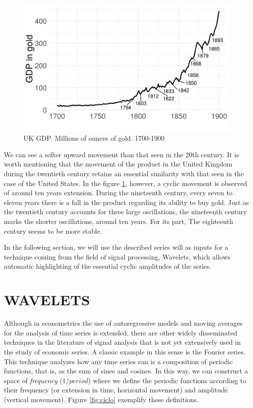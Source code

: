 \documentclass[a4paper,10cpi]{article}
\begin{document}
	\begin{figure}[H]
		\centering
		\includegraphics[width=0.75\linewidth]{uk_gdp_en.png}
		\caption{UK GDP. Millions of ounces of gold. 1700-1900} 
		\label{fig:uk_gdp}
	\end{figure}
	
	
	We can see a softer upward movement than that seen in the 20th century. It is worth mentioning that the movement of the product in the United Kingdom during the twentieth century retains an essential similarity with that seen in the case of the United States. In the figure \ref{fig:uk_gdp}, however, a cyclic movement is observed of around ten years extension. During the nineteenth century, every seven to eleven years there is a fall in the product regarding its ability to buy gold. Just as the twentieth century accounts for three large oscillations, the nineteenth century marks the shorter oscillations, around ten years. For its part, The eighteenth century seems to be more stable.
	
	In the following section, we will use the described series will as inputs for a technique coming from the field of signal processing, Wavelets, which allows automatic highlighting of the essential cyclic amplitudes of the series.
	
	\section{\uppercase{\textbf{\normalsize{Wavelets}}}}
	
	Although in econometrics the use of autoregressive models and moving averages for the analysis of time series is extended, there are other widely disseminated techniques in the literature of signal analysis that is not yet extensively used in the study of economic series. A classic example in this sense is the Fourier series. This technique analyzes how any time series can is a composition of periodic functions, that is, as the sum of sines and cosines. In this way, we can construct a space of \textit{frequency} ($1/period$) where we define the periodic functions according to their frequency (or extension in time, horizontal movement) and amplitude (vertical movement). Figure \ref{fig:ciclo} exemplify these definitions.
	
\end{document}
